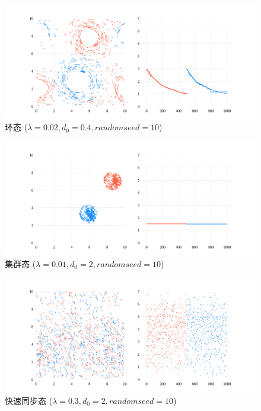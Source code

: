 \documentclass{article}
\begin{document}
\begin{figure}[H]
	\centering
	\includegraphics[width=\textwidth]{./figs/CorrectCoupling_uniform_0.020_0.40_10_radius.png}
	\vspace{-1cm}
	\caption{环态 ($\lambda=0.02, d_0=0.4, random seed=10$)}
	\label{fig:fig22.2}
\end{figure}

\vspace{-1cm}

\begin{figure}[H]
	\centering
	\includegraphics[width=\textwidth]{./figs/CorrectCoupling_uniform_0.010_2.00_10_radius.png}
	\vspace{-1cm}
	\caption{集群态 ($\lambda=0.01, d_0=2, random seed=10$)}
	\label{fig:fig22.3}
\end{figure}

\begin{figure}[H]
	\centering
	\includegraphics[width=\textwidth]{./figs/CorrectCoupling_uniform_0.300_2.00_10_radius.png}
	\vspace{-1cm}
	\caption{快速同步态 ($\lambda=0.3, d_0=2, random seed=10$)}
	\label{fig:fig22.4}
\end{figure}
\end{document}
